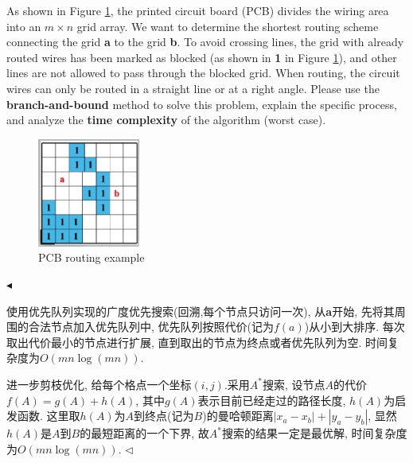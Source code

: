 \documentclass[11pt]{article}
\newenvironment{problem}[2][Problem]{\begin{trivlist}
\item[\hskip \labelsep{\bfseries#1}\hskip\labelsep{\bfseries#2.}]}{\hfill$\blacktriangleleft$\end{trivlist}}
\newenvironment{answer}[1][Answer]{\begin{trivlist}
\item[\hskip \labelsep{\bfseries\itshape#1.}\hskip \labelsep]}{\hfill$\lhd$\end{trivlist}}
\begin{document}
\begin{problem}{4. (Circuit Routing)}
    As shown in Figure \ref{fig_routing}, the printed circuit board (PCB) divides the wiring area into an $m\times n$ grid array. We want to determine the shortest routing scheme connecting the grid \textbf{a} to the grid \textbf{b}. To avoid crossing lines, the grid with already routed wires has been marked as blocked (as shown in \textbf{1} in Figure \ref{fig_routing}), and other lines are not allowed to pass through the blocked grid. When routing, the circuit wires can only be routed in a straight line or at a right angle. Please use the \textbf{branch-and-bound} method to solve this problem, explain the specific process, and analyze the \textbf{time complexity} of the algorithm (worst case).
    \begin{figure}[H]
        \centering
        \includegraphics[width=0.3\textwidth]{images/routing.jpg}
        \caption{PCB routing example}
        \label{fig_routing}
    \end{figure}
\end{problem}
\begin{answer}
    使用优先队列实现的广度优先搜索(回溯,每个节点只访问一次), 从\textbf{a}开始, 先将其周围的合法节点加入优先队列中, 优先队列按照代价(记为$f(a)$)从小到大排序. 每次取出代价最小的节点进行扩展, 直到取出的节点为终点或者优先队列为空. 时间复杂度为$O(mn\log(mn))$.
    
    进一步剪枝优化, 给每个格点一个坐标$(i,j).$采用$A^*$搜索, 设节点$A$的代价$f(A) = g(A) + h(A)$, 其中$g(A)$表示目前已经走过的路径长度, $h(A)$为启发函数. 这里取$h(A)$为$A$到终点(记为$B$)的曼哈顿距离$|x_a - x_b| + |y_a - y_b|$, 显然$h(A)$是$A$到$B$的最短距离的一个下界, 故$A^*$搜索的结果一定是最优解, 时间复杂度为$O(mn\log(mn))$.
\end{answer}
\end{document}
